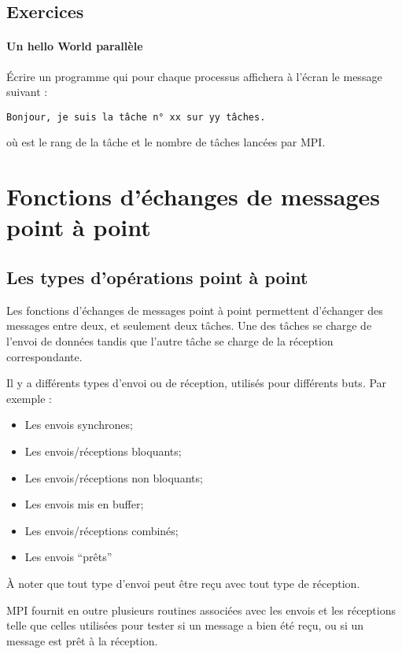\documentclass[11pt,a4paper]{article}
\begin{document}
\subsection{Exercices}

\paragraph{Un hello World parallèle}

\'Ecrire un programme qui pour chaque processus affichera à l'écran le message suivant :
\begin{verbatim}
Bonjour, je suis la tâche n° xx sur yy tâches.
\end{verbatim}
où \verb@xx@ est le rang de la tâche et \verb@yy@ le nombre de tâches lancées par MPI.

\section{Fonctions d'échanges de messages point à point}

\subsection{Les types d'opérations point à point}

Les fonctions d'échanges de messages point à point permettent d'échanger des messages
entre deux, et seulement deux tâches. Une des tâches se charge de l'envoi de données
tandis que l'autre tâche se charge de la réception correspondante.

Il y a différents types d'envoi ou de réception, utilisés pour différents buts. Par exemple :
\begin{itemize}
\item Les envois synchrones;
\item Les envois/réceptions bloquants;
\item Les envois/réceptions non bloquants;
\item Les envois mis en buffer;
\item Les envois/réceptions combinés;
\item Les envois ``prêts''
\end{itemize}

\`A noter que tout type d'envoi peut être reçu avec tout type de réception.

MPI fournit en outre plusieurs routines associées avec les envois et les réceptions telle que celles utilisées
pour tester si un message a bien été reçu, ou si un message est prêt à la réception.
\end{document}
